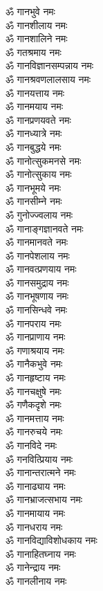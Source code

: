 \begin{multicols}{2}
\begin{flushleft}
ॐ गानभुवे नमः\\
ॐ गानशीलाय नमः\\
ॐ गानशालिने नमः\\
ॐ गतश्रमाय नमः\\
ॐ गानविज्ञानसम्पन्नाय नमः\\
ॐ गानश्रवणलालसाय नमः\hfill{}\\
ॐ गानयत्ताय नमः\\
ॐ गानमयाय नमः\\
ॐ गानप्रणयवते नमः\\
ॐ गानध्यात्रे नमः\\
ॐ गानबुद्धये नमः\\
ॐ  गानोत्सुकमनसे नमः\\
ॐ गानोत्सुकाय नमः\\
ॐ गानभूमये नमः\\
ॐ गानसीम्ने नमः\\
ॐ गुनोज्ज्वलाय नमः\hfill{}\\
ॐ गानाङ्गज्ञानवते नमः\\
ॐ गानमानवते नमः\\
ॐ गानपेशलाय नमः\\
ॐ गानवत्प्रणयाय नमः\\
ॐ गानसमुद्राय नमः\\
ॐ गानभूषणाय नमः\\
ॐ गानसिन्धवे नमः\\
ॐ गानपराय नमः\\
ॐ गानप्राणाय नमः\\
ॐ गणाश्रयाय नमः\hfill{}\\
ॐ गानैकभुवे नमः\\
ॐ गानहृष्टाय नमः\\
ॐ गानचक्षुषे नमः\\
ॐ गणैकदृशे नमः\\
ॐ गानमत्ताय नमः\\
ॐ गानरुचये नमः\\
ॐ गानविदे नमः\\
ॐ गनवित्प्रियाय नमः\\
ॐ गानान्तरात्मने नमः\\
ॐ गानाढ्याय नमः\hfill{}\\
ॐ गानभ्राजत्सभाय नमः\\
ॐ गानमायाय नमः\\
ॐ गानधराय नमः\\
ॐ गानविद्याविशोधकाय नमः\\
ॐ गानाहितघ्नाय नमः\\
ॐ गानेन्द्राय नमः\\
ॐ गानलीनाय नमः\\

\end{flushleft}
\end{multicols}
